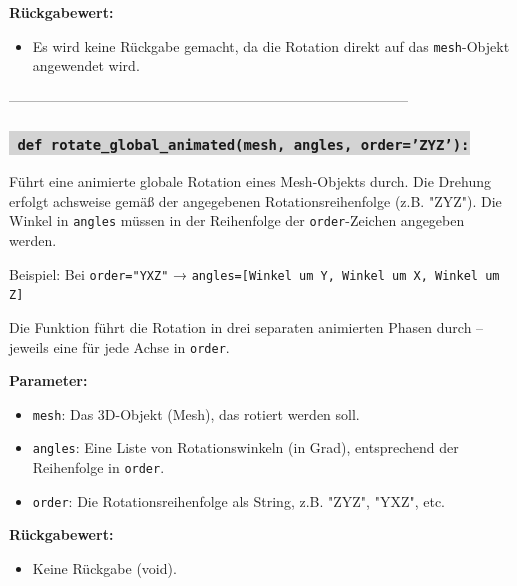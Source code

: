 \noindent \textbf{Rückgabewert:} \vspace{-6ex} \\
\begin{itemize}
    \setlength{\itemindent}{1em}
    \item Es wird keine Rückgabe gemacht, da die Rotation direkt auf das \texttt{mesh}-Objekt angewendet wird.
\end{itemize}

--------------------------------------------------------------------------------------


\label{sec:rotate_global_animated}
\subsubsection*{\colorbox{lightgray}{\texttt{\textbf{\color{green} def} \color{blue} rotate\_global\_animated}\textbf{\texttt{(mesh, angles, order='ZYZ'):}}}}
Führt eine animierte globale Rotation eines Mesh-Objekts durch. Die Drehung erfolgt achsweise gemäß der angegebenen Rotationsreihenfolge (z.B. "ZYZ"). Die Winkel in \texttt{angles} müssen in der Reihenfolge der \texttt{order}-Zeichen angegeben werden.

Beispiel: Bei \texttt{order="YXZ"} → \texttt{angles=[Winkel um Y, Winkel um X, Winkel um Z]}

Die Funktion führt die Rotation in drei separaten animierten Phasen durch – jeweils eine für jede Achse in \texttt{order}.

\noindent \textbf{Parameter:} \vspace{-6ex} \\
\begin{itemize}
    \setlength{\itemindent}{1em}
    \item \texttt{mesh}: Das 3D-Objekt (Mesh), das rotiert werden soll.
    \item \texttt{angles}: Eine Liste von Rotationswinkeln (in Grad), entsprechend der Reihenfolge in \texttt{order}.
    \item \texttt{order}: Die Rotationsreihenfolge als String, z.B. "ZYZ", "YXZ", etc.
\end{itemize}

\noindent \textbf{Rückgabewert:} \vspace{-6ex} \\
\begin{itemize}
    \setlength{\itemindent}{1em}
    \item Keine Rückgabe (void).
\end{itemize}

